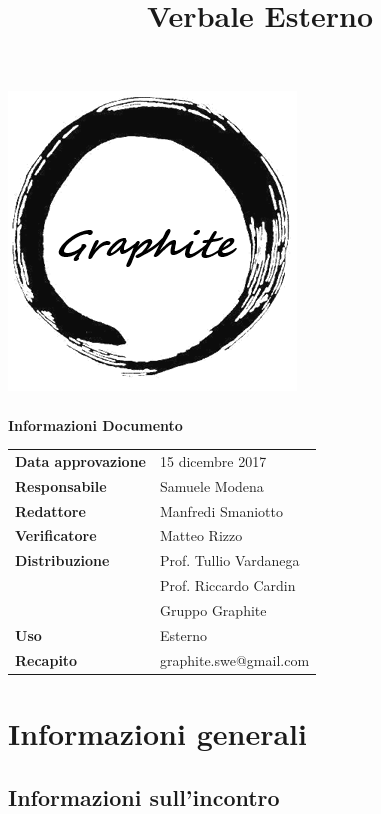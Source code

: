 \documentclass[openany,12pt,a4paper]{article}
\title{Verbale Esterno}
\author{}
\begin{document}
	\makeatletter
	\begin{titlepage}
		\setlength{\headsep}{0pt}  
		\begin{center}
			\includegraphics[width=0.5\linewidth]{Logo.png}\\[1em]
			{\huge \bfseries  \@title }\\[10ex]
			\textbf{\Large Informazioni Documento} \\[2em]
			\bgroup
			\def\arraystretch{1.5}
			\begin{tabular}{l|l}
				\textbf{Data approvazione} & 15 dicembre 2017 \\
				\textbf{Responsabile} & Samuele Modena \\
				\textbf{Redattore} & Manfredi Smaniotto \\
				\textbf{Verificatore} & Matteo Rizzo \\
				\textbf{Distribuzione} & Prof. Tullio Vardanega \\
				 & Prof. Riccardo Cardin \\
				 & Gruppo Graphite \\
				\textbf{Uso} & Esterno \\
				\textbf{Recapito} & graphite.swe@gmail.com \\
			\end{tabular}
		\egroup
		\end{center}
	\end{titlepage}
	\makeatother

	\thispagestyle{empty}
	\newpage
	
	\tableofcontents
	\newpage
	
	\section{Informazioni generali}
	
	\subsection{Informazioni sull'incontro}
	
\end{document}
